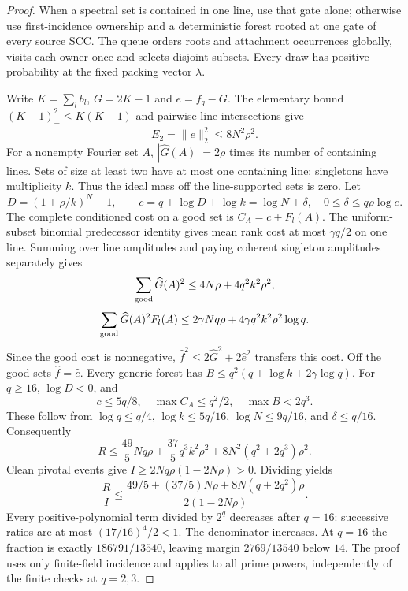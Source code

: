 \documentclass[11pt]{article}
\begin{document}
\begin{proof}
When a spectral set is contained in one line, use that gate alone;
otherwise use first-incidence ownership and a deterministic forest
rooted at one gate of every source SCC. The queue orders roots and
attachment occurrences globally, visits each owner once and selects
disjoint subsets. Every draw has positive probability at the fixed
packing vector $\lambda$.

Write $K=\sum_l b_l$, $G=2K-1$ and $e=f_q-G$. The elementary bound
$(K-1)_+^2\le K(K-1)$ and pairwise line intersections give
\[
 E_2=\|e\|_2^2\le8N^2\rho^2.
\]
For a nonempty Fourier set $A$, $|\widehat G(A)|=2\rho$ times its
number of containing lines. Sets of size at least two have at most
one containing line; singletons have multiplicity $k$. Thus the ideal
mass off the line-supported sets is zero. Let
\[
 D=(1+\rho/k)^N-1,\qquad
 c=q+\log D+\log k=\log N+\delta,\quad
 0\le\delta\le q\rho\log e.
\]
The complete conditioned cost on a good set is $C_A=c+F_l(A)$.
The uniform-subset binomial predecessor identity gives mean rank
cost at most $\gamma q/2$ on one line. Summing over line amplitudes
and paying coherent singleton amplitudes separately gives
\[
 \sum_{\rm good}\widehat G(A)^2\le4N\rho+4q^2k^2\rho^2,
\]
\[
 \sum_{\rm good}\widehat G(A)^2F_l(A)
 \le2\gamma Nq\rho+4\gamma q^2k^2\rho^2\log q.
\]
Since the good cost is nonnegative,
$\widehat f^2\le2\widehat G^2+2\widehat e^2$ transfers this cost.
Off the good sets $\widehat f=\widehat e$. Every generic forest has
$B\le q^2(q+\log k+2\gamma\log q)$.
For $q\ge16$, $\log D<0$, and
\[
 c\le5q/8,\quad \max C_A\le q^2/2,\quad \max B<2q^3.
\]
These follow from $\log q\le q/4$, $\log k\le5q/16$,
$\log N\le9q/16$, and $\delta\le q/16$.
Consequently
\[
 R\le\frac{49}{5}Nq\rho+\frac{37}{5}q^3k^2\rho^2
       +8N^2(q^2+2q^3)\rho^2.
\]
Clean pivotal events give
$I\ge2Nq\rho(1-2N\rho)>0$. Dividing yields
\[
 \frac RI\le
 \frac{49/5+(37/5)N\rho+8N(q+2q^2)\rho}{2(1-2N\rho)}.
\]
Every positive-polynomial term divided by $2^q$ decreases after
$q=16$: successive ratios are at most $(17/16)^4/2<1$.
The denominator increases. At $q=16$ the fraction is exactly
$186791/13540$, leaving margin $2769/13540$ below $14$.
The proof uses only finite-field incidence and applies to all prime
powers, independently of the finite checks at $q=2,3$.
\end{proof}
\end{document}
